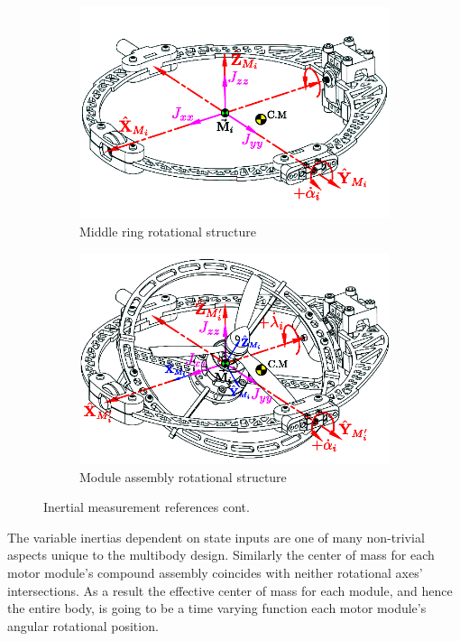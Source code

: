 \vspace{-15pt}
\begin{figure}[htbp]
\begin{subfigure}{0.49\textwidth}
\includegraphics[width=\textwidth]{figs/inertia-middle}
\caption{Middle ring rotational structure}
\label{fig:inertia-middle}
\end{subfigure}
\begin{subfigure}{0.49\textwidth}
\includegraphics[width=\textwidth]{figs/inertia-module}
\caption{Module assembly rotational structure}
\label{fig:inertia-module}
\end{subfigure}
\caption{Inertial measurement references cont.}
\end{figure}
\par
The variable inertias dependent on state inputs are one of many non-trivial aspects unique to the multibody design. Similarly the center of mass for each motor module's compound assembly coincides with neither rotational axes' intersections. As a result the effective center of mass for each module, and hence the entire body, is going to be a time varying function each motor module's angular rotational position.
